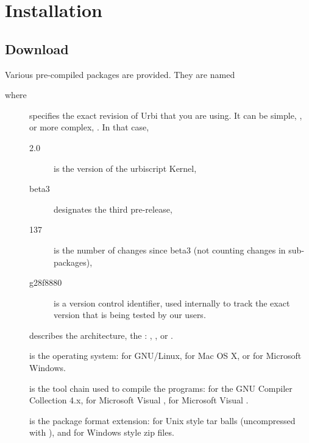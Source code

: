 
\chapter{Installation}
\label{sec:installation}

\section{Download}

Various pre-compiled packages are provided.  They are named
\begin{center}
\end{center}
where
\begin{description}
\item[] specifies the exact revision of Urbi that you are
  using.  It can be simple, , or more complex,
  .  In that case,
  \begin{description}
  \item[2.0] is the version of the urbiscript Kernel,
  \item[beta3] designates the third pre-release,
  \item[137] is the number of changes since beta3 (not counting
    changes in sub-packages),
  \item[g28f8880] is a version control identifier, used internally to
    track the exact version that is being tested by our users.
  \end{description}
\item[] describes the architecture, the :
  , , or .
\item[] is the operating system:  for GNU/Linux,
   for Mac OS X, or  for Microsoft Windows.
\item[] is the tool chain used to compile the programs:
   for the GNU Compiler Collection 4.x,  for
  Microsoft Visual ,  for Microsoft Visual
  .
\item[] is the package format extension:  for
  Unix style tar balls (uncompressed with ), and  for Windows style zip files.
\end{description}

